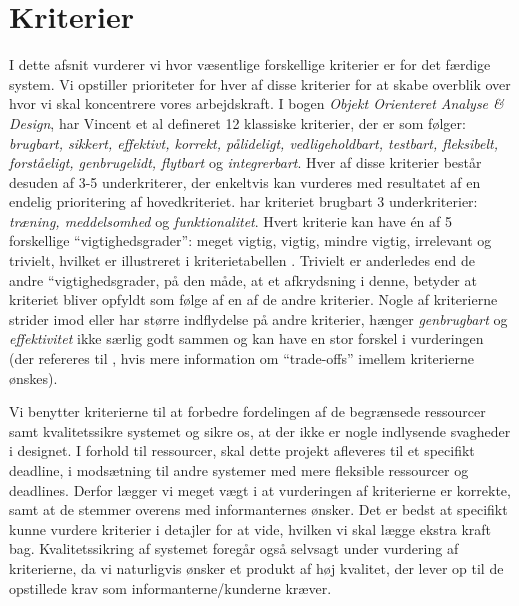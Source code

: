\section{Kriterier}

I dette afsnit vurderer vi hvor væsentlige forskellige kriterier er for det færdige system. Vi opstiller prioriteter for hver af disse kriterier for at skabe overblik over hvor vi skal koncentrere vores arbejdskraft. I bogen \emph{Objekt Orienteret Analyse \& Design}\cite{ooad}, har Vincent et al defineret 12 klassiske kriterier, der er som følger: \emph{brugbart, sikkert, effektivt, korrekt, pålideligt, vedligeholdbart, testbart, fleksibelt, forståeligt, genbrugelidt, flytbart} og \emph{integrerbart}. Hver af disse kriterier består desuden af 3-5 underkriterer, der enkeltvis kan vurderes med resultatet af en endelig prioritering af hovedkriteriet. \Fx har kriteriet brugbart 3 underkriterier: \emph{træning, meddelsomhed} og \emph{funktionalitet}. 
Hvert kriterie kan have én af 5 forskellige ``vigtighedsgrader'': meget vigtig, vigtig, mindre vigtig, irrelevant og trivielt, hvilket er illustreret i kriterietabellen . Trivielt er anderledes end de andre ``vigtighedsgrader, på den måde, at et afkrydsning i denne, betyder at kriteriet bliver opfyldt som følge af en af de andre kriterier. 
Nogle af kriterierne strider imod eller har større indflydelse på andre kriterier, \fx hænger \emph{genbrugbart} og \emph{effektivitet} ikke særlig godt sammen og kan have en stor forskel i vurderingen (der refereres til \cite[s.~18]{crit}, hvis mere information om ``trade-offs'' imellem kriterierne ønskes).



Vi benytter kriterierne til at forbedre fordelingen af de begrænsede ressourcer samt kvalitetssikre systemet og sikre os, at der ikke er nogle indlysende svagheder i designet. I forhold til ressourcer, skal dette projekt afleveres til et specifikt deadline, i modsætning til andre systemer med mere fleksible ressourcer og deadlines. Derfor lægger vi meget vægt i at vurderingen af kriterierne er korrekte, samt at de stemmer overens med informanternes ønsker. Det er bedst at specifikt kunne vurdere kriterier i detajler for at vide, hvilken vi skal lægge ekstra kraft bag. Kvalitetssikring af systemet foregår også selvsagt under vurdering af kriterierne, da vi naturligvis ønsker et produkt af høj kvalitet, der lever op til de opstillede krav som informanterne/kunderne kræver.

